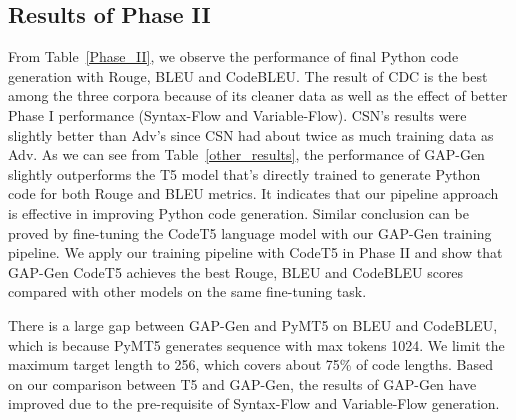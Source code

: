 \documentclass[11pt]{article}
\begin{document}
\subsection{Results of Phase II}





From Table~\ref{Phase_II}, we observe the performance of final Python code generation with Rouge, BLEU and CodeBLEU. The result of CDC is the best among the three corpora because of its cleaner data as well as the effect of better Phase I performance (Syntax-Flow and Variable-Flow). CSN's results were slightly better than Adv's since CSN had about twice as much training data as Adv. As we can see from Table~\ref{other_results}, the performance of GAP-Gen slightly outperforms the T5 model that's directly trained to generate Python code for both Rouge and BLEU metrics. It indicates that our pipeline approach is effective in improving Python code generation. Similar conclusion can be proved by fine-tuning the CodeT5 language model with our GAP-Gen training pipeline. We apply our training pipeline with CodeT5 in Phase II and show that GAP-Gen CodeT5 achieves the best Rouge, BLEU and CodeBLEU scores compared with other models on the same fine-tuning task.

There is a large gap between GAP-Gen and PyMT5 on BLEU and CodeBLEU, which is because PyMT5 generates sequence with max tokens 1024. We limit the maximum target length to 256, which covers about 75\% of code lengths. Based on our comparison between T5 and GAP-Gen, the results of GAP-Gen have improved due to the pre-requisite of Syntax-Flow and Variable-Flow generation. 










 
\end{document}
